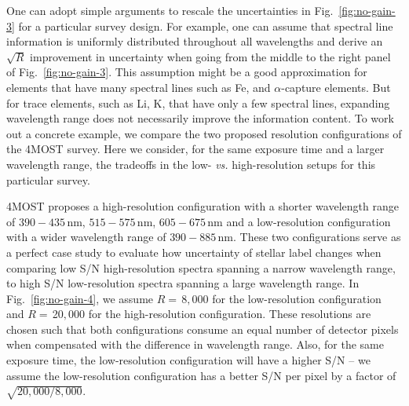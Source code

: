 \documentclass[iop]{emulateapj}
\begin{document}
\begin{CJK*}{UTF8}{gbsn}
One can adopt simple arguments to rescale the uncertainties in Fig.~\ref{fig:no-gain-3} for a particular survey design. For example, one can assume that spectral line information is uniformly distributed throughout all wavelengths and derive an $\sqrt{R}$ improvement in uncertainty when going from the middle to the right panel of Fig.~\ref{fig:no-gain-3}. This assumption might be a good approximation for elements that have many spectral lines such as Fe, and $\alpha$-capture elements. But for trace elements, such as Li, K, that have only a few spectral lines, expanding wavelength range does not necessarily improve the information content. To work out a concrete example, we compare the two proposed resolution configurations of the 4MOST survey. Here we consider, for the same exposure time and a larger wavelength range, the tradeoffs in the low- {\it vs.} high-resolution setups for this particular survey.

4MOST proposes a high-resolution configuration with a shorter wavelength range of $390 - 435\,$nm, $515 - 575\,$nm, $605 - 675\,$nm and a low-resolution configuration with a wider wavelength range of $390 - 885\,$nm. These two configurations serve as a perfect case study to evaluate how uncertainty of stellar label changes when comparing low S/N high-resolution spectra spanning a narrow wavelength range, to high S/N low-resolution spectra spanning a large wavelength range. In Fig.~\ref{fig:no-gain-4}, we assume $R = \,$8$,$000 for the low-resolution configuration and $R = \,$20$,$000 for the high-resolution configuration. These resolutions are chosen such that both configurations consume an equal number of detector pixels when compensated with the difference in wavelength range. Also, for the same exposure time, the low-resolution configuration will have a higher S/N -- we assume the low-resolution configuration has a better S/N per pixel by a factor of $\sqrt{20,000/8,000}$.


\end{CJK*}
\end{document}
